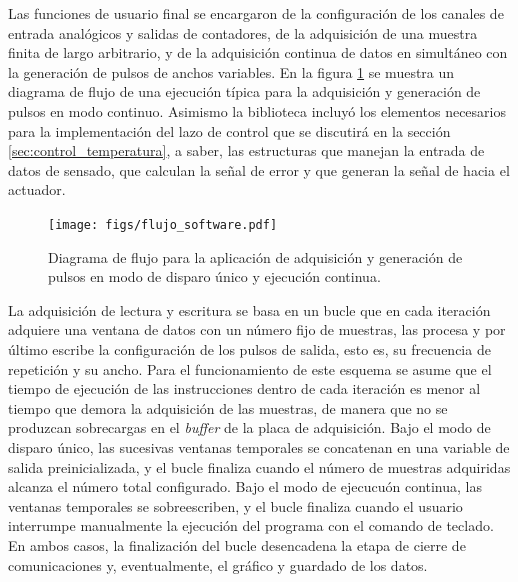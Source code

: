 \documentclass[a4paper,11pt]{article}
\begin{document}
	Las funciones de usuario final se encargaron de la configuración de los canales de entrada analógicos y salidas de contadores, de la adquisición de una muestra finita de largo arbitrario, y de la adquisición continua de datos en simultáneo con la generación de pulsos de anchos variables. En la figura \ref{fig:flujo_software} se muestra un diagrama de flujo de una ejecución típica para la adquisición y generación de pulsos en modo continuo. Asimismo la biblioteca incluyó los elementos necesarios para la implementación del lazo de control que se discutirá en la sección \ref{sec:control_temperatura}, a saber, las estructuras que manejan la entrada de datos de sensado, que calculan la señal de error y que generan la señal de hacia el actuador.
	
	\begin{figure}[h!]
        \centering
        \texttt{[image: figs/flujo\_software.pdf]}
        \caption{Diagrama de flujo para la aplicación de adquisición y generación de pulsos en modo de disparo único y ejecución continua.}
        \label{fig:flujo_software}
    \end{figure}	
	
	La adquisición de lectura y escritura se basa en un bucle que en cada iteración adquiere una ventana de datos con un número fijo de muestras, las procesa y por último escribe la configuración de los pulsos de salida, esto es, su frecuencia de repetición y su ancho. Para el funcionamiento de este esquema se asume que el tiempo de ejecución de las instrucciones dentro de cada iteración es menor al tiempo que demora la adquisición de las muestras, de manera que no se produzcan sobrecargas en el \emph{buffer} de la placa de adquisición. Bajo el modo de disparo único, las sucesivas ventanas temporales se concatenan en una variable de salida preinicializada, y el bucle finaliza cuando el número de muestras adquiridas alcanza el número total configurado. Bajo el modo de ejecucuón continua, las ventanas temporales se sobreescriben, y el bucle finaliza cuando el usuario interrumpe manualmente la ejecución del programa con el comando de teclado. En ambos casos, la finalización del bucle desencadena la etapa de cierre de comunicaciones y, eventualmente, el gráfico y guardado de los datos.
	
\end{document}
